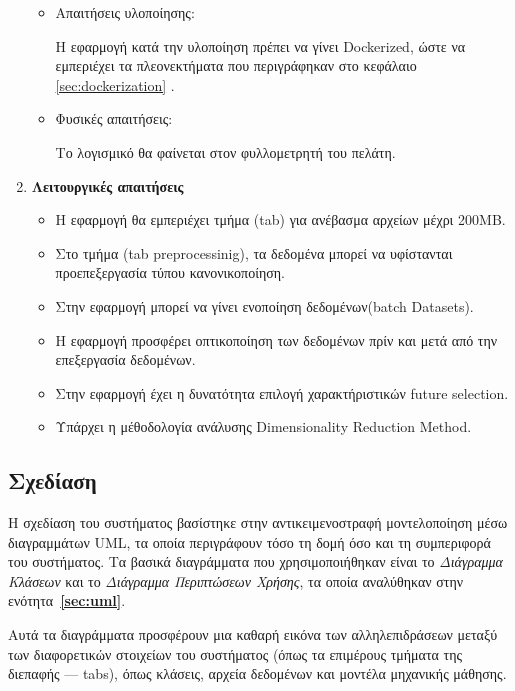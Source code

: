 \documentclass{article}  %
\begin{document}
\begin{enumerate}
\begin{itemize}
        \item Απαιτήσεις υλοποίησης:
        
            Η εφαρμογή κατά την υλοποίηση πρέπει να γίνει Dockerized, ώστε να εμπεριέχει τα πλεονεκτήματα που περιγράφηκαν στο κεφάλαιο \ref{sec:dockerization} .
            
        \item Φυσικές απαιτήσεις:

            Το λογισμικό θα φαίνεται στον φυλλομετρητή του πελάτη.
    \end{itemize}
    
    \item \textbf{Λειτουργικές απαιτήσεις}
    \begin{itemize}
        \item Η εφαρμογή θα εμπεριέχει τμήμα (tab) για ανέβασμα αρχείων μέχρι 200MB.
        \item Στο τμήμα (tab preprocessinig), τα δεδομένα μπορεί να υφίστανται προεπεξεργασία τύπου κανονικοποίηση.
        \item Στην εφαρμογή μπορεί να γίνει ενοποίηση δεδομένων(batch Datasets).
        \item Η εφαρμογή προσφέρει οπτικοποίηση των δεδομένων πρίν και μετά από την επεξεργασία δεδομένων.
        \item Στην εφαρμογή έχει η δυνατότητα επιλογή χαρακτήριστικών {future selection}.
        \item Υπάρχει η μέθοδολογία ανάλυσης {Dimensionality Reduction Method}.
    \end{itemize}
        
\end{enumerate}





\subsection{Σχεδίαση}

Η σχεδίαση του συστήματος βασίστηκε στην αντικειμενοστραφή μοντελοποίηση μέσω διαγραμμάτων UML, τα οποία περιγράφουν τόσο τη δομή όσο και τη συμπεριφορά του συστήματος. Τα βασικά διαγράμματα που χρησιμοποιήθηκαν είναι το \textit{Διάγραμμα Κλάσεων} και το \textit{Διάγραμμα Περιπτώσεων Χρήσης}, τα οποία αναλύθηκαν στην ενότητα~\textbf{\ref{sec:uml}}.

Αυτά τα διαγράμματα προσφέρουν μια καθαρή εικόνα των αλληλεπιδράσεων μεταξύ των διαφορετικών στοιχείων του συστήματος (όπως τα επιμέρους τμήματα της διεπαφής — tabs), όπως κλάσεις, αρχεία δεδομένων και μοντέλα μηχανικής μάθησης.
\end{document}
